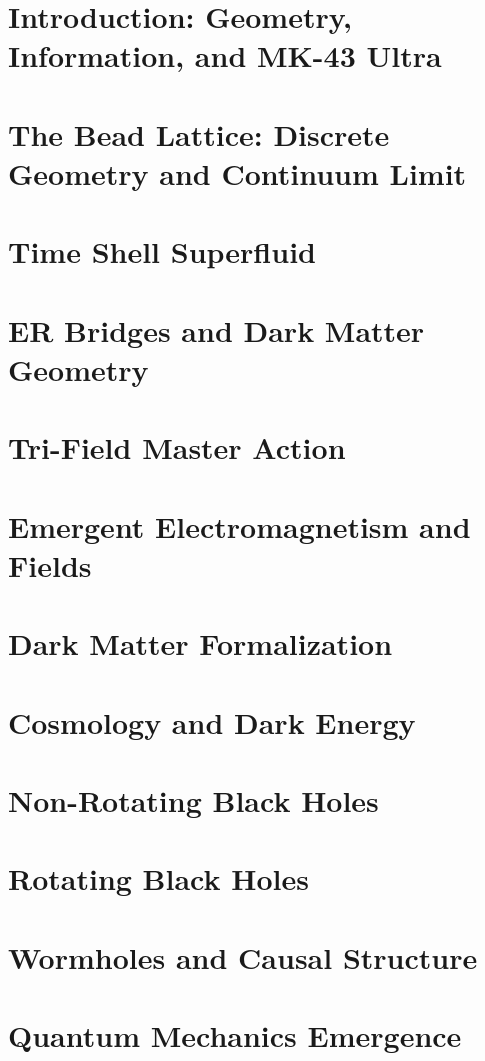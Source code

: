 \mainmatter

\chapter{Introduction: Geometry, Information, and MK-43 Ultra}

\chapter{The Bead Lattice: Discrete Geometry and Continuum Limit}
\chapter{Time Shell Superfluid}
\chapter{ER Bridges and Dark Matter Geometry}
\chapter{Tri-Field Master Action}
\chapter{Emergent Electromagnetism and Fields}
\chapter{Dark Matter Formalization}
\chapter{Cosmology and Dark Energy}
\chapter{Non-Rotating Black Holes}
\chapter{Rotating Black Holes}
\chapter{Wormholes and Causal Structure}
\chapter{Quantum Mechanics Emergence}

